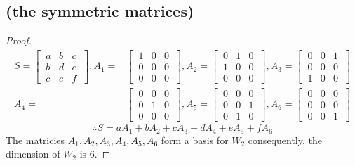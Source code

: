 \documentclass[../main.tex]{subfiles}
\begin{document}
\subsection{ (the symmetric matrices)}
\begin{proof}
        \begin{align*}
                S =     \begin{bmatrix}
                        \ a & b & c \ \\
                        \ b & d & e \ \\
                        \ c & e & f \
                \end{bmatrix},
                A_{1} = & \begin{bmatrix}
                        \ 1 & 0 & 0 \ \\
                        \ 0 & 0 & 0 \ \\
                        \ 0 & 0 & 0 \
                \end{bmatrix},
                A_{2} = \begin{bmatrix}
                        \ 0 & 1 & 0 \ \\
                        \ 1 & 0 & 0 \ \\
                        \ 0 & 0 & 0 \
                \end{bmatrix},
                A_{3} = \begin{bmatrix}
                        \ 0 & 0 & 1 \ \\
                        \ 0 & 0 & 0 \ \\
                        \ 1 & 0 & 0 \
                \end{bmatrix}    \\
                A_{4} = & \begin{bmatrix}
                        \ 0 & 0 & 0 \ \\
                        \ 0 & 1 & 0 \ \\
                        \ 0 & 0 & 0 \
                \end{bmatrix},
                A_{5} = \begin{bmatrix}
                        \ 0 & 0 & 0 \ \\
                        \ 0 & 0 & 1 \ \\
                        \ 0 & 1 & 0 \
                \end{bmatrix},
                A_{6}= \begin{bmatrix}
                        \ 0 & 0 & 0 \ \\
                        \ 0 & 0 & 0 \ \\
                        \ 0 & 0 & 1 \
                \end{bmatrix}
        \end{align*}
        $$\therefore S = aA_{1}+bA_{2}+cA_{3}+dA_{4}+eA_{5}+fA_{6}$$
        The matricies $A_{1},A_{2},A_{3},A_{4},A_{5},A_{6}$ form a basis for $W_2$ consequently, the dimension of $W_2$ is $6$.
\end{proof}
\end{document}
